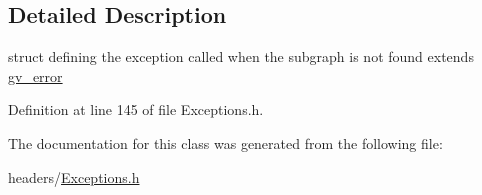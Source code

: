 \subsection{Detailed Description}
struct defining the exception called when the subgraph is not found extends \hyperlink{structgv__error}{gv\+\_\+error} 

Definition at line 145 of file Exceptions.\+h.



The documentation for this class was generated from the following file\+:\begin{DoxyCompactItemize}
\item 
headers/\hyperlink{Exceptions_8h}{Exceptions.\+h}\end{DoxyCompactItemize}

